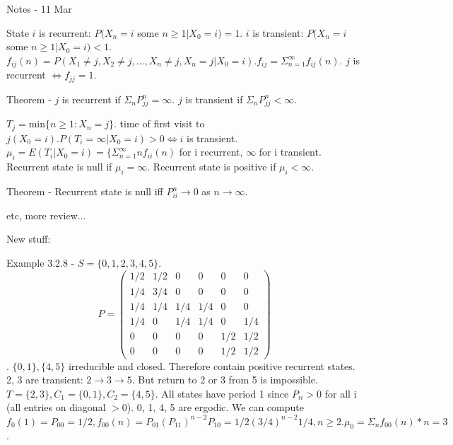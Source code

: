 \documentclass{article}
\begin{document}
Notes - 11 Mar

State $i$ is recurrent: $P(X_n=i$ some $n \ge 1|X_0=i)=1$. $i$ is transient: $P(X_n=i$ some $n \ge 1|X_0=i) < 1$. $f_{ij}(n) = P(X_1 \ne j, X_2 \ne j, \dots, X_n \ne j, X_n=j|X_0=i). f_{ij} = \Sigma_{n=1}^\infty f_{ij} (n)$. $j$ is recurrent $\iff f_{jj} = 1$.

Theorem - $j$ is recurrent if $\Sigma_n P_{jj}^n = \infty$. $j$ is transient if $\Sigma_n P_{jj}^n < \infty$.

$T_j = $min$\{n \ge 1: X_n=j\}$. time of first visit to $j (X_0=i). P(T_i = \infty | X_0=i) > 0 \iff i$ is transient. $\mu_i = E(T_i | X_0=i) = \{ \Sigma_{n=1}^\infty n f_{ii}(n)$ for i recurrent, $\infty$ for i transient. Recurrent state is null if $\mu_i = \infty$. Recurrent state is positive if $\mu_i < \infty$.

Theorem - Recurrent state is null iff $P_{ii}^n \rightarrow 0$ as $n \rightarrow \infty$.

etc, more review...

New stuff:

Example 3.2.8 - $S = \{0, 1, 2, 3, 4, 5\}$. \begin{displaymath} P = \left( \begin{array}{cccccc} 1/2 & 1/2 & 0 & 0 & 0 & 0 \\ 1/4 & 3/4 & 0 & 0 & 0 & 0 \\ 1/4 & 1/4 & 1/4 & 1/4 & 0 & 0 \\ 1/4 & 0 & 1/4 & 1/4 & 0 & 1/4 \\ 0 & 0 & 0 & 0 & 1/2 & 1/2 \\ 0 & 0 & 0 & 0 & 1/2 & 1/2 \end{array} \right) \end{displaymath}. $\{0, 1\}, \{4, 5\}$ irreducible and closed. Therefore contain positive recurrent states. 2, 3 are transient: $2 \rightarrow 3 \rightarrow 5$. But return to 2 or 3 from 5 is impossible. $T = \{2, 3\}, C_1 = \{0, 1\}, C_2 = \{4, 5\}$. All states have period 1 since $P_{ii} > 0$ for all i (all entries on diagonal $> 0$). 0, 1, 4, 5 are ergodic. We can compute $f_0(1) = P_{00} = 1/2, f_{00}(n) = P_{01} (P_{11})^{n-2} P_{10} = 1/2 (3/4)^{n-2} 1/4, n \ge 2. \mu_0 = \Sigma_n f_{00}(n) * n = 3$.
\end{document}

